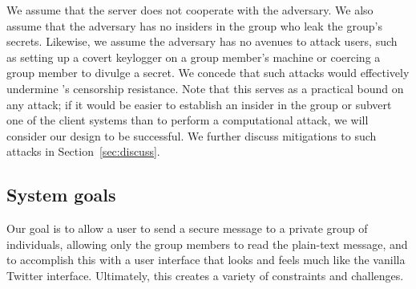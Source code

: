 We assume that the \hoot server does not cooperate with the adversary. We
also assume that the adversary has no insiders in the group who leak the
group's secrets. Likewise, we assume the adversary has no avenues
to attack users, such as setting up a covert keylogger
on a group member's machine or coercing a group
member to divulge a secret. We concede that such attacks would effectively undermine \hoot's censorship
resistance. Note that this serves as a practical bound on any attack; if
it would be easier to establish an insider in the group or subvert one
of the client systems than to perform a computational attack, we will
consider our design to be successful.
We further discuss mitigations to such attacks in Section~\ref{sec:discuss}.

\subsection{System goals} \label{sec:goals}
Our goal is to allow a user to send a secure message to a private group
of individuals, allowing only the group members to read the plain-text
message, and to accomplish this with a user interface that looks and
feels much like the vanilla Twitter interface. Ultimately, this creates
a variety of constraints and challenges.

